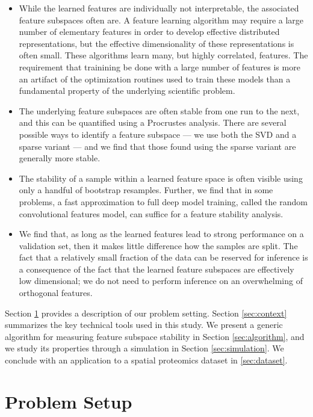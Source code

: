 \begin{itemize}
\item While the learned features are individually not interpretable, the associated feature subspaces often are. A feature learning algorithm may require a large number of elementary features in order to develop effective distributed representations, but the effective dimensionality of these representations is often small. These algorithms learn many, but highly correlated, features. The requirement that trainining be done with a large number of features is more an artifact of the optimization routines used to train these models than a fundamental property of the underlying scientific problem.
\item The underlying feature subspaces are often stable from one run to the next, and this can be quantified using a Procrustes analysis. There are several possible ways to identify a feature subspace — we use both the SVD and a sparse variant — and we find that those found using the sparse variant are generally more stable.
\item The stability of a sample within a learned feature space is often visible using only a handful of bootstrap resamples. Further, we find that in some problems, a fast approximation to full deep model training, called the random convolutional features model, can suffice for a feature stability analysis.
\item We find that, as long as the learned features lead to strong performance on a validation set, then it makes little difference how the samples are split. The fact that a relatively small fraction of the data can be reserved for inference is a consequence of the fact that the learned feature subspaces are effectively low dimensional; we do not need to perform inference on an overwhelming of orthogonal features.
\end{itemize}

Section \ref{sec:psetup} provides a description of our problem setting. Section \ref{sec:context} summarizes the key technical tools used in this study. We present a generic algorithm for measuring feature subspace stability in Section \ref{sec:algorithm}, and we study its properties through a simulation in Section \ref{sec:simulation}. We conclude with an application to a spatial proteomics dataset in \ref{sec:dataset}.

\section{Problem Setup}
\label{sec:psetup}

